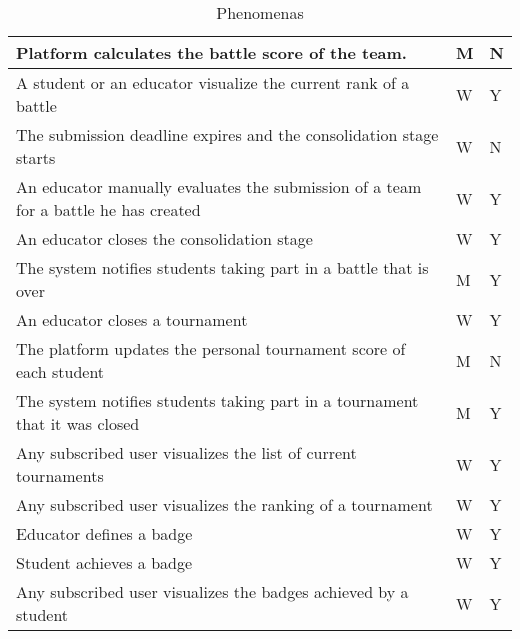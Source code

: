 \begin{table}[H]
    \centering
    \begin{tabular}{|p{3.8in}|p{1.2in}|p{1.2in}|} \hline
        Platform calculates the battle score of the team.                                   & M & N \\ \hline
        A student or an educator visualize the current rank of a battle                     & W & Y \\ \hline
        The submission deadline expires and the consolidation stage starts                  & W & N \\ \hline
        An educator manually evaluates the submission of a team for a battle he has created & W & Y \\ \hline
        An educator closes the consolidation stage                                          & W & Y \\ \hline
        The system notifies students taking part in a battle that is over                   & M & Y \\ \hline
        An educator closes a tournament                                                     & W & Y \\ \hline
        The platform updates the personal tournament score of each student                  & M & N \\ \hline
        The system notifies students taking part in a tournament that it was closed         & M & Y \\ \hline
        Any subscribed user visualizes the list of current tournaments                      & W & Y \\ \hline
        Any subscribed user visualizes the ranking of a tournament                          & W & Y \\ \hline
        Educator defines a badge                                                            & W & Y \\ \hline
        Student achieves a badge                                                            & W & Y \\ \hline
        Any subscribed user visualizes the badges achieved by a student                     & W & Y \\ \hline
    \end{tabular}
    \\[10pt]
    \caption{Phenomenas}
\end{table}



